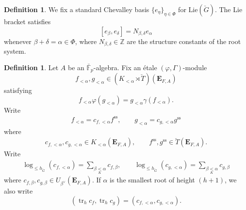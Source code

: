 \documentclass[11pt]{amsart}
\theoremstyle{definition}
\newtheorem{defn}[thm]{Definition}
\newcommand{\bfE}{\mathbf{E}}
\newcommand{\lK}{\underset{K}{<}}
\renewcommand{\SS}{{\operatorname{ss}}}
\newcommand{\bFp}{\bar{\mathbb{F}}_p}
\newcommand{\bG}{\breve{G}}
\newcommand{\bT}{\breve{T}}
\DeclareMathOperator{\tr}{tr}
\DeclareMathOperator{\Gal}{Gal}
\begin{document}
\begin{defn}
We fix a standard Chevalley basis 
$\{e_\eta\}_{\eta \in \Phi}$ for $\mathrm{Lie}(\bG)$.
The Lie bracket satisfies 
\begin{equation}
\label{eq:Nab}
[e_\beta, e_\delta] = N_{\beta, \delta} e_\alpha
\end{equation}
whenever $\beta + \delta = \alpha \in \Phi$, where $N_{\beta, \delta} \in \mathbb{Z}$ are the structure constants of the root system.
\end{defn}

\begin{defn}
\label{defn:coordinate}
Let $A$ be an $\bFp$-algebra.
Fix an \'etale $(\varphi, \Gamma)$-module
\[
f_{< \alpha}, g_{< \alpha} \in (K_{< \alpha}\rtimes\bT)
(\bfE_{F, A})
\]
satisfying
\[
f_{< \alpha} \varphi(g_{< \alpha})
=g_{< \alpha} \gamma(f_{< \alpha}).
\]
Write
\begin{align*}
f_{ <\alpha} = c_{f,< \alpha} f^\SS, \qquad
g_{< \alpha} = c_{g,< \alpha} g^\SS
\end{align*}
where
\begin{align*}
c_{f, < \alpha}, c_{g, < \alpha}
\in K_{< \alpha}(\bfE_{F, A}),\qquad
f^{\SS}, g^\SS
\in \bT(\bfE_{F, A}).
\end{align*}
Write
\begin{align*}
\log_{\le h_{\bG}}(c_{f, < \alpha})
=
\sum_{\beta\lK \alpha} c_{f, \beta},\qquad
\log_{\le h_{\bG}}(c_{g, < \alpha})
=
\sum_{\beta\lK \alpha} c_{g, \beta}
\end{align*}
where
$c_{f, \beta}, c_{g,\beta}\in U_{\beta^\vee}(\bfE_{F, A})$.
If $\alpha$ is the smallest root of height $(h+1)$,
we also write
\[
(\tr_h c_f, \tr_h c_g)
=(c_{f, < \alpha}, c_{g, <\alpha}).
\]
\end{defn}
\end{document}
